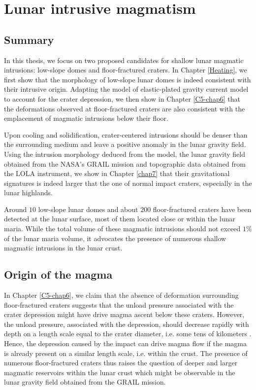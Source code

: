 \section{Lunar intrusive magmatism}
\label{sec:terr-intr-magm}

\subsection{Summary}
\label{sec:summary}

In this thesis, we focus on  two proposed candidates for shallow lunar
magmatic intrusions: low-slope domes  and floor-fractured craters.  In
Chapter \ref{Heating}, we first show  that the morphology of low-slope
lunar  domes  is  indeed   consistent  with  their  intrusive  origin.
Adapting the model of elastic-plated  gravity current model to account
for the crater depression, we then show in Chapter \ref{C5-chap6} that
the  deformations   observed  at  floor-fractured  craters  are  also
consistent  with the  emplacement of  magmatic intrusions  below their
floor.

Upon cooling and solidification,  crater-centered intrusions should be
denser than the surrounding medium and leave a positive anomaly in the
lunar gravity field.  Using the  intrusion morphology deduced from the
model, the lunar gravity field  obtained from the NASA’s GRAIL mission
and topographic  data obtained  from the LOLA  instrument, we  show in
Chapter  \ref{chap7} that  their  gravitational  signatures is  indeed
larger that the one of normal  impact craters, especially in the lunar
highlands.

Around  $10$ low-slope  lunar  domes and  about $200$  floor-fractured
craters have been detected at the  lunar surface, most of them located
close  or within  the lunar  maria. While  the total  volume of  these
magmatic intrusions should not exceed $1\%$ of the lunar maria volume,
it advocates the  presence of numerous shallow  magmatic intrusions in
the lunar crust.

\subsection{Origin of the magma}
\label{sec:crust-magm-intr}

In Chapter  \ref{C5-chap6}, we claim  that the absence  of deformation
surrounding floor-fractured craters suggests  that the unload pressure
associated with  the crater depression  might have drive  magma ascent
below these craters. However, the unload pressure, associated with the
depression, should decrease rapidly with depth on a length scale equal
to   the   crater   diameter,    i.e.    some   tens   of   kilometers
\citep{Pinel:2000wa}. Hence,  the depression caused by  the impact can
drive magma flow  if the magma is already present  on a similar length
scale,   i.e.   within   the   crust.   The   presence   of   numerous
floor-fractured craters thus raises the  question of deeper and larger
magmatic reservoirs within  the lunar crust which  might be observable
in the lunar gravity field obtained from the GRAIL mission.

